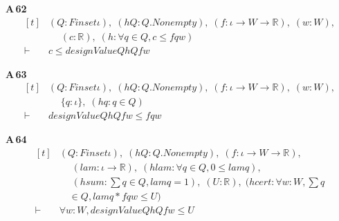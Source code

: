 \noindent\textbf{A\,62}\quad{}
{\footnotesize\[ \begin{aligned}[t]
&(\mathit{Q} : \mathit{Finset} \iota ),\; (\mathit{hQ} : \mathit{Q}.\mathit{Nonempty}),\; (\mathit{f} : \iota \to \mathit{W} \to \mathbb{R} ),\; (\mathit{w} : \mathit{W}),\\
&\quad \; (\mathit{c} : \mathbb{R} ),\; (\mathit{h} : \forall \mathit{q} \in \mathit{Q}, \mathit{c} \leq \mathit{f} \mathit{q} \mathit{w})\\
\vdash\;&\mathit{c} \leq \mathit{designValue} \mathit{Q} \mathit{hQ} \mathit{f} \mathit{w}
\end{aligned} \]}

\noindent\textbf{A\,63}\quad{}
{\footnotesize\[ \begin{aligned}[t]
&(\mathit{Q} : \mathit{Finset} \iota ),\; (\mathit{hQ} : \mathit{Q}.\mathit{Nonempty}),\; (\mathit{f} : \iota \to \mathit{W} \to \mathbb{R} ),\; (\mathit{w} : \mathit{W}),\\
&\quad \; \{ \mathit{q} : \iota \},\; (\mathit{hq} : \mathit{q} \in \mathit{Q})\\
\vdash\;&\mathit{designValue} \mathit{Q} \mathit{hQ} \mathit{f} \mathit{w} \leq \mathit{f} \mathit{q} \mathit{w}
\end{aligned} \]}

\noindent\textbf{A\,64}\quad{}
{\footnotesize\[ \begin{aligned}[t]
&(\mathit{Q} : \mathit{Finset} \iota ),\; (\mathit{hQ} : \mathit{Q}.\mathit{Nonempty}),\; (\mathit{f} : \iota \to \mathit{W} \to \mathbb{R} ),\\
&\quad \; (\mathit{lam} : \iota \to \mathbb{R} ),\; (\mathit{hlam} : \forall \mathit{q} \in \mathit{Q}, 0 \leq \mathit{lam} \mathit{q}),\\
&\quad \; (\mathit{hsum} : \textstyle\sum \mathit{q} \in \mathit{Q}, \mathit{lam} \mathit{q} = 1),\; (\mathit{U} : \mathbb{R} ),\; (\mathit{hcert} : \forall \mathit{w} : \mathit{W}, \textstyle\sum \mathit{q}\\
&\quad \in \mathit{Q}, \mathit{lam} \mathit{q} * \mathit{f} \mathit{q} \mathit{w} \leq \mathit{U})\\
\vdash\;&\forall \mathit{w} : \mathit{W}, \mathit{designValue} \mathit{Q} \mathit{hQ} \mathit{f} \mathit{w} \leq \mathit{U}
\end{aligned} \]}

